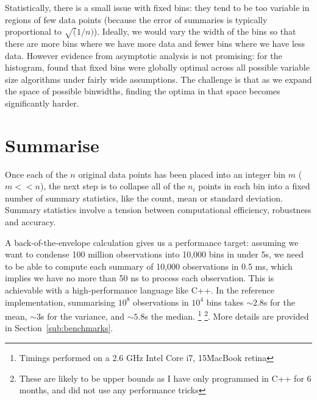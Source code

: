 \documentclass[journal]{vgtc}                %
\begin{document}
Statistically, there is a small issue with fixed bins: they tend to be too variable in regions of few data points (because the error of summaries is typically proportional to $\sqrt(1/n)$). Ideally, we would vary the width of the bins so that there are more bins where we have more data and fewer bins where we have less data. However evidence from asymptotic analysis is not promising: for the histogram, \cite{kogure:1987} found that fixed bins were globally optimal across all possible variable size algorithms under fairly wide assumptions. The challenge is that as we expand the space of possible binwidths, finding the optima in that space becomes significantly harder. 



\section{Summarise}
\label{sec:summarise}

Once each of the $n$ original data points has been placed into an integer bin $m$ ($m << n$), the next step is to collapse all of the $n_i$ points in each bin into a fixed number of summary statistics, like the count, mean or standard deviation. Summary statistics involve a tension between computational efficiency, robustness and accuracy.

A back-of-the-envelope calculation gives us a performance target: assuming we want to condense 100 million observations into 10,000 bins in under 5s, we need to be able to compute each summary of 10,000 observations in 0.5 ms, which implies we have no more than 50 ns to process each observation. This is achievable with a high-performance language like C++. In the reference implementation, summarising $10^8$ observations in $10^4$ bins takes $\sim 2.8$s for the mean, $\sim 3$s for the variance, and $\sim 5.8$s the median. \footnote{Timings performed on a 2.6 GHz Intel Core i7, 15\" MacBook retina} \footnote{These are likely to be upper bounds as I have only programmed in C++ for 6 months, and did not use any performance tricks}.  More details are provided in Section~\ref{sub:benchmarks}.
\end{document}
